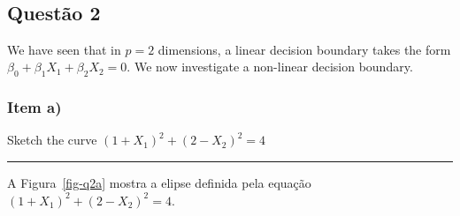 \documentclass[
  a4paperpaper,
]{article}
\begin{document}
~

\subsection{Questão 2}\label{questuxe3o-2}

We have seen that in \(p = 2\) dimensions, a linear decision boundary
takes the form \(\beta_0 +\beta_1X_1 +\beta_2X_2 = 0\). We now
investigate a non-linear decision boundary.

\subsubsection{Item a)}\label{item-a-1}

Sketch the curve \((1 + X_1)^2 + (2 − X_2)^2 = 4\)

\begin{center}\rule{0.5\linewidth}{0.5pt}\end{center}

A Figura~\ref{fig-q2a} mostra a elipse definida pela equação
\((1 + X_1)^2 + (2 − X_2)^2 = 4\).
\end{document}
